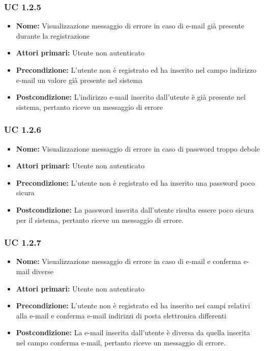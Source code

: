 \documentclass[a4paper, oneside, dvipsnames, table]{article} %
\begin{document}
\subsubsection{UC 1.2.5}%
\begin{itemize}
\item \textbf{Nome:} Visualizzazione messaggio di errore in caso di e-mail già presente durante la registrazione
\item \textbf{Attori primari:} Utente non autenticato
\item \textbf{Precondizione:} L’utente non è registrato ed ha inserito nel campo indirizzo e-mail un valore già presente nel sistema
\item \textbf{Postcondizione:} L'indirizzo e-mail inserito dall'utente è già presente nel sistema, pertanto riceve un messaggio di errore 
\end{itemize}

\subsubsection{UC 1.2.6}%
\begin{itemize}
\item \textbf{Nome:} Visualizzazione messaggio di errore in caso di password troppo debole 
\item \textbf{Attori primari:} Utente non autenticato
\item \textbf{Precondizione:} L’utente non è registrato ed ha inserito una password poco sicura
\item \textbf{Postcondizione:} La password inserita dall’utente risulta essere poco sicura per il sistema, pertanto riceve un messaggio di errore.
\end{itemize}

\subsubsection{UC 1.2.7}%
\begin{itemize}
\item \textbf{Nome:} Visualizzazione messaggio di errore in caso di e-mail e conferma e-mail diverse
\item \textbf{Attori primari:} Utente non autenticato
\item \textbf{Precondizione:} L’utente non è registrato ed ha inserito nei campi relativi alla e-mail e conferma e-mail indirizzi di posta elettronica differenti 
\item \textbf{Postcondizione:} La e-mail inserita dall'utente è diversa da quella inserita nel campo conferma e-mail, pertanto riceve un messaggio di errore.
\end{itemize}
\end{document}
